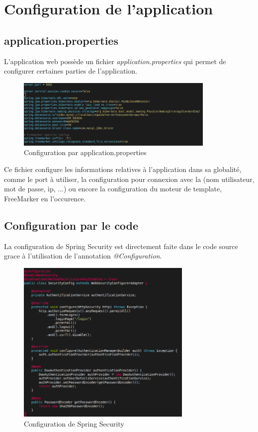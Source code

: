 	\newpage
	\section{Configuration de l'application}

		\subsection{application.properties}

			L'application web possède un fichier \textit{application.properties} qui permet de configurer certaines parties de l'application.

			\begin{figure}[H]
				\centering\includegraphics[width=0.85\textwidth, keepaspectratio]{res/application-properties.png}
				\caption{Configuration par application.properties}
			\end{figure}

			Ce fichier configure les informations relatives à l'application dans sa globalité, comme le port à utiliser, la configuration pour connexion avec la \bdd{} (nom utilisateur, mot de passe, ip, ...) ou encore la configuration du moteur de template, FreeMarker en l'occurence.

		\newpage
		\subsection{Configuration par le code}
			\label{subsec:webapp_configCode}

			La configuration de Spring Security est directement faite dans le code source grace à l'utilisation de l'annotation \textit{@Configuration}.

			\begin{figure}[H]
				\centering\includegraphics[width=0.75\textwidth, keepaspectratio]{res/SecurityConfig.png}
				\caption{Configuration de Spring Security}
			\end{figure}

